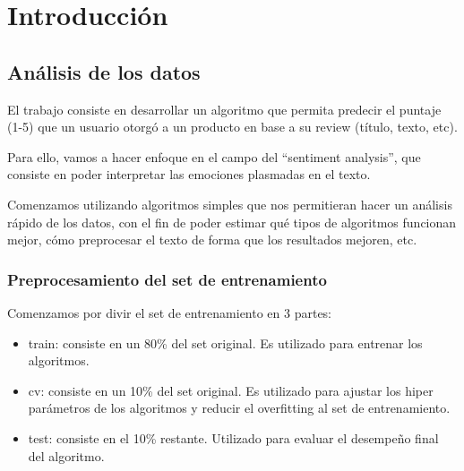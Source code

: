 
\chapter{Introducci\'on} %

\label{Chapter1}


\section{An\'alisis de los datos}

El trabajo consiste en desarrollar un algoritmo que permita predecir el puntaje (1-5) que un usuario
otorg\'o a un producto en base a su review (t\'itulo, texto, etc).

Para ello, vamos a hacer enfoque en el campo del ``sentiment analysis'', que consiste en poder
interpretar las emociones plasmadas en el texto.

Comenzamos utilizando algoritmos simples que nos permitieran hacer un an\'alisis r\'apido de los
datos, con el fin de poder estimar qu\'e tipos de algoritmos funcionan mejor, c\'omo preprocesar el
texto de forma que los resultados mejoren, etc.

\subsection{Preprocesamiento del set de entrenamiento}

Comenzamos por divir el set de entrenamiento en 3 partes:\\


\begin{itemize}
\setlength\itemsep{0em}
  \item train: consiste en un 80\% del set original. Es utilizado para entrenar los algoritmos.
  \item cv: consiste en un 10\% del set original. Es utilizado para ajustar los hiper par\'ametros de los
        algoritmos y reducir el overfitting al set de entrenamiento.
  \item test: consiste en el 10\% restante. Utilizado para evaluar el desempe\~no final del algoritmo.
\end{itemize}

